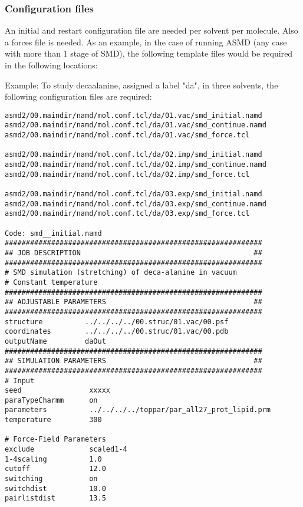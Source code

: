 \documentclass[11pt]{article}
\begin{document}
\begin{verbatim}
\end{verbatim}

\subsubsection{Configuration files}
An initial and restart configuration file are needed per solvent per molecule. Also a forces file is needed. As an example, in the case of running ASMD (any case with more than 1 stage of SMD), the following template files would be required in the following locations:

Example: To study decaalanine, assigned a label "da", in three solvents, the following configuration files are required:

\begin{verbatim}
asmd2/00.maindir/namd/mol.conf.tcl/da/01.vac/smd_initial.namd
asmd2/00.maindir/namd/mol.conf.tcl/da/01.vac/smd_continue.namd
asmd2/00.maindir/namd/mol.conf.tcl/da/01.vac/smd_force.tcl

asmd2/00.maindir/namd/mol.conf.tcl/da/02.imp/smd_initial.namd
asmd2/00.maindir/namd/mol.conf.tcl/da/02.imp/smd_continue.namd
asmd2/00.maindir/namd/mol.conf.tcl/da/02.imp/smd_force.tcl

asmd2/00.maindir/namd/mol.conf.tcl/da/03.exp/smd_initial.namd
asmd2/00.maindir/namd/mol.conf.tcl/da/03.exp/smd_continue.namd
asmd2/00.maindir/namd/mol.conf.tcl/da/03.exp/smd_force.tcl

Code: smd__initial.namd
#############################################################
## JOB DESCRIPTION                                         ##
#############################################################
# SMD simulation (stretching) of deca-alanine in vacuum
# Constant temperature
#############################################################
## ADJUSTABLE PARAMETERS                                   ##
#############################################################
structure          ../../../../00.struc/01.vac/00.psf
coordinates        ../../../../00.struc/01.vac/00.pdb
outputName         daOut
#############################################################
## SIMULATION PARAMETERS                                   ##
#############################################################
# Input
seed                xxxxx
paraTypeCharmm	    on
parameters          ../../../../toppar/par_all27_prot_lipid.prm
temperature         300
 
# Force-Field Parameters
exclude             scaled1-4
1-4scaling          1.0
cutoff              12.0
switching           on
switchdist          10.0
pairlistdist        13.5


\end{verbatim}
\end{document}
